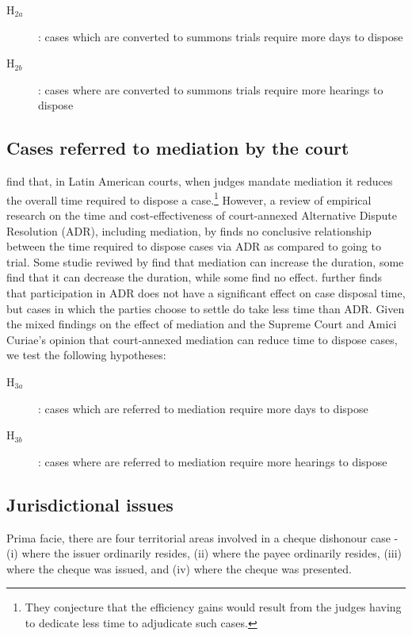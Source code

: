 \begin{description}
\item[H$_{2a}$] : cases which are converted to summons trials require more days to dispose
\item[H$_{2b}$] : cases where are converted to summons trials require more hearings to dispose
\end{description}

\subsection{Cases referred to mediation by the court} \label{sec:furth-exam-cases}

\textcite{buscaglia1997_latinAmericaCourtDelays} find that, in Latin American courts, when judges mandate mediation it reduces the overall time required to dispose a case.\footnote{They conjecture that the efficiency gains would result from the judges having to dedicate less time to adjudicate such cases.} However, a review of empirical research on the time and cost-effectiveness of court-annexed Alternative Dispute Resolution (ADR), including mediation, by \textcite{wissler2004effectiveness} finds no conclusive relationship between the time required to dispose cases via ADR as compared to going to trial. Some studie reviwed by \textcite{wissler2004effectiveness} find that mediation can increase the duration, some find that it can decrease the duration, while some find no effect. \textcite{heise2010adr} further finds that participation in ADR does not have a significant effect on case disposal time, but cases in which the parties choose to settle do take less time than ADR. Given the mixed findings on the effect of mediation and the Supreme Court and Amici Curiae's opinion that court-annexed mediation can reduce time to dispose cases, we test the following hypotheses:

\begin{description}
\item[H$_{3a}$] : cases which are referred to mediation require more days to dispose
\item[H$_{3b}$] : cases where are referred to mediation require more hearings to dispose
\end{description}

\subsection{Jurisdictional issues}

Prima facie, there are four territorial areas involved in a cheque dishonour case - (i) where the issuer ordinarily resides, (ii) where the payee ordinarily resides, (iii) where the cheque was issued, and (iv) where the cheque was presented. 

